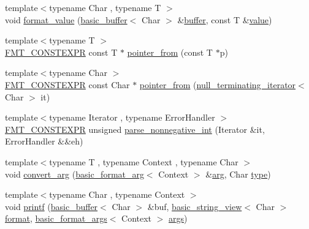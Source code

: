 \begin{DoxyCompactItemize}
\item 
{\footnotesize template$<$typename Char , typename T $>$ }\\void \hyperlink{namespaceinternal_a1be3f9974ada7afa2fc121fd6cf13521}{format\+\_\+value} (\hyperlink{classinternal_1_1basic__buffer}{basic\+\_\+buffer}$<$ Char $>$ \&\hyperlink{namespaceinternal_a5fcdbc3efad1f390e6c3f0fdafa56122}{buffer}, const T \&\hyperlink{classinternal_1_1value}{value})
\item 
{\footnotesize template$<$typename T $>$ }\\\hyperlink{core_8h_a69201cb276383873487bf68b4ef8b4cd}{F\+M\+T\+\_\+\+C\+O\+N\+S\+T\+E\+X\+PR} const T $\ast$ \hyperlink{namespaceinternal_ad87d0379a03bffd4618909e465a35dfa}{pointer\+\_\+from} (const T $\ast$p)
\item 
{\footnotesize template$<$typename Char $>$ }\\\hyperlink{core_8h_a69201cb276383873487bf68b4ef8b4cd}{F\+M\+T\+\_\+\+C\+O\+N\+S\+T\+E\+X\+PR} const Char $\ast$ \hyperlink{namespaceinternal_af2847d65bcda093de54229cfc396c072}{pointer\+\_\+from} (\hyperlink{classinternal_1_1null__terminating__iterator}{null\+\_\+terminating\+\_\+iterator}$<$ Char $>$ it)
\item 
{\footnotesize template$<$typename Iterator , typename Error\+Handler $>$ }\\\hyperlink{core_8h_a69201cb276383873487bf68b4ef8b4cd}{F\+M\+T\+\_\+\+C\+O\+N\+S\+T\+E\+X\+PR} unsigned \hyperlink{namespaceinternal_a869c63300bb6636a767d8f3ba6507575}{parse\+\_\+nonnegative\+\_\+int} (Iterator \&it, Error\+Handler \&\&eh)
\item 
{\footnotesize template$<$typename T , typename Context , typename Char $>$ }\\void \hyperlink{namespaceinternal_a51007b037fc1ae75f525ff89401ec56b}{convert\+\_\+arg} (\hyperlink{classbasic__format__arg}{basic\+\_\+format\+\_\+arg}$<$ Context $>$ \&\hyperlink{core_8h_ab87859023d64d26171b1e74a3d0c3b99}{arg}, Char \hyperlink{namespaceinternal_a8661864098ac0acff9a6dd7e66f59038}{type})
\item 
{\footnotesize template$<$typename Char , typename Context $>$ }\\void \hyperlink{namespaceinternal_adb04322abcec003865318281a6952434}{printf} (\hyperlink{classinternal_1_1basic__buffer}{basic\+\_\+buffer}$<$ Char $>$ \&buf, \hyperlink{classbasic__string__view}{basic\+\_\+string\+\_\+view}$<$ Char $>$ \hyperlink{locale_8h_a4d9ddd9260f49d99308d41580d169bd2}{format}, \hyperlink{classbasic__format__args}{basic\+\_\+format\+\_\+args}$<$ Context $>$ \hyperlink{printf_8h_a47047b7b28fd1342eef756b79c778580}{args})

\end{DoxyCompactItemize}
